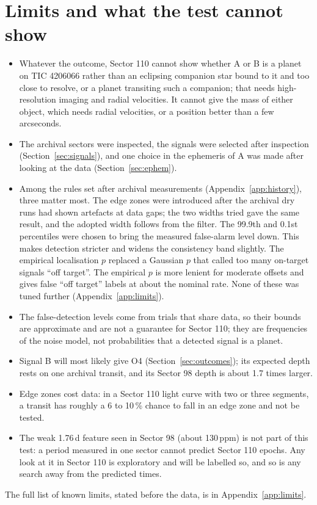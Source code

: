 \section{Limits and what the test cannot show} \label{sec:limits}

\begin{itemize}
\item Whatever the outcome, Sector 110 cannot show whether A or B is a planet on TIC 4206066 rather than an eclipsing
  companion star bound to it and too close to resolve, or a planet transiting such a companion; that needs
  high-resolution imaging and radial velocities. It cannot give
  the mass of either object, which needs radial velocities, or a position better than a few arcseconds.
\item The archival sectors were inspected, the signals were selected after inspection (Section~\ref{sec:signals}), and
  one choice in the ephemeris of A was made after looking at the data (Section~\ref{sec:ephem}).
\item Among the rules set after archival measurements (Appendix~\ref{app:history}), three matter most. The edge zones were introduced after the archival dry runs had
  shown artefacts at data gaps; the two widths tried gave the same result, and the adopted width follows from the
  filter. The 99.9th and 0.1st percentiles were chosen to bring the measured false-alarm level down. This makes detection
  stricter and widens the consistency band slightly. The empirical localisation $p$ replaced a Gaussian $p$ that
  called too many on-target signals ``off target''. The empirical $p$ is more lenient for moderate offsets and gives
  false ``off target'' labels at about the nominal rate. None of these was tuned
  further (Appendix~\ref{app:limits}).
\item The false-detection levels come from trials that share data, so their bounds are approximate and are not a
  guarantee for Sector 110; they are frequencies of the noise model, not probabilities that a detected signal is a
  planet.
\item Signal B will most likely give O4 (Section~\ref{sec:outcomes}); its expected depth rests on one archival transit,
  and its Sector 98 depth is about 1.7 times larger.
\item Edge zones cost data: in a Sector 110 light curve with two or three segments, a transit has roughly a 6 to 10\,\%
  chance to fall in an edge zone and not be tested.
\item The weak 1.76\,d feature seen in Sector 98 (about 130\,ppm) is not part of this test: a period measured in one
  sector cannot predict Sector 110 epochs. Any look at it in Sector 110 is exploratory and will be labelled so, and so
  is any search away from the predicted times.
\end{itemize}
The full list of known limits, stated before the data, is in Appendix~\ref{app:limits}.
